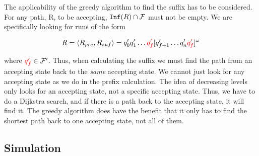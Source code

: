 The applicability of the greedy algorithm to find the suffix has to be considered. For any path, R, to be accepting, $\texttt{Inf}(R) \cap \mathcal{F}$ must not be empty. We are specifically looking for runs of the form 

\begin{align*}
R &= \langle R_{pre}, R_{suf} \rangle = q_0' q_1' \dots {\color{red} q_f'} [q_{f+1}' \dots q_n' {\color{red} q_f'}]^\omega \\
\end{align*}

where ${\color{red} q_f'} \in \mathcal{F}'$. Thus, when calculating the suffix we must find the path from an accepting state back to the \textit{same} accepting state. We cannot just look for any accepting state as we do in the prefix calculation. The idea of decreasing levels only looks for an accepting state, not a specific accepting state. Thus, we have to do a Dijkstra search, and if there is a path back to the accepting state, it will find it. The greedy algorithm does have the benefit that it only has to find the shortest path back to one accepting state, not all of them.





\subsection{Simulation}





